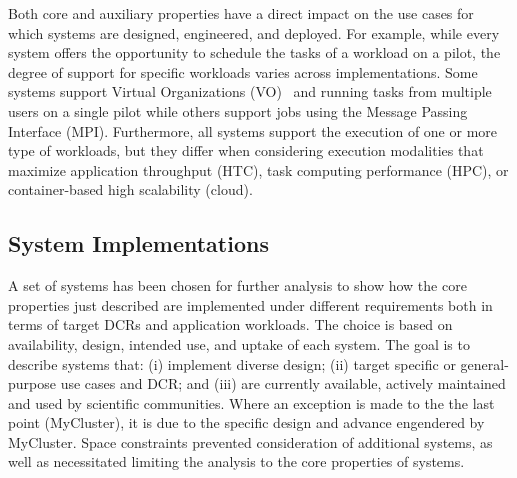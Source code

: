 \documentclass{sig-alternate}
\begin{document}
Both core and auxiliary properties have a direct impact on the use cases for
which \pilot systems are designed, engineered, and deployed. For example, while
every \pilot system offers the opportunity to schedule the tasks of a workload
on a pilot, the degree of support for specific workloads varies across
implementations. Some \pilot systems support Virtual Organizations
(VO)~\cite{foster2001} and running tasks from multiple users on a single pilot
while others support jobs using the Message Passing Interface (MPI).
Furthermore, all \pilot systems support the execution of one or more type of
workloads, but they differ when considering execution modalities that maximize
application throughput (HTC), task computing performance (HPC), or
container-based high scalability (cloud).



%
\subsection{\pilot System Implementations}
\label{sec:implementations}

A set of \pilot systems has been chosen for further analysis to show how the
core properties just described are implemented under different requirements both
in terms of target DCRs and application workloads. The choice is based on
availability, design, intended use, and uptake of each \pilot system. The goal
is to describe systems that: (i) implement diverse design; (ii) target specific
or general-purpose use cases and DCR; and (iii) are currently available,
actively maintained and used by scientific communities. Where an exception is
made to the the last point (MyCluster), it is due to the specific design and
advance engendered by MyCluster. Space constraints prevented consideration of
additional \pilot systems, as well as necessitated limiting the analysis to the
core properties of \pilot systems.

\end{document}
